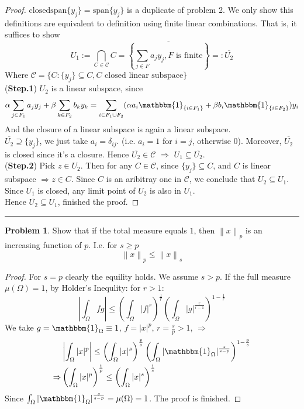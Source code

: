 \documentclass[a4paper, 10pt]{article}
\theoremstyle{definition}
\newtheorem{problem}{Problem}
\theoremstyle{hSol}
\begin{document}
\begin{proof} $\text{closedspan}\{y_j\}=\overline{\text{span}\{y_j\}}$ is a duplicate of problem 2. We only show this definitions are equivalent to definition using finite linear combinations. That is, it suffices to show
$$U_1:=\bigcap_{C\in \mathscr{C}}C = \overline{\left\{\sum_{j\in F} a_j y_j, \text{$F$ is finite}\right\}}=:\overline{U_2}$$
Where $\mathscr{C}=\{C: \{y_j\}\subseteq C, C \text{ closed linear subspace}\}$ \\
(\textbf{Step.1}) $U_2$ is a linear subspace, since
$$\alpha \sum_{j\in F_1} a_j y_j + \beta \sum_{k\in F_2} b_k y_k =  \sum_{i\in F_1 \cup F_2}(\alpha a_i \mathbbm{1}_{\{i\in F_1\}}+\beta b_i \mathbbm{1}_{\{i\in F_2\}}) y_i$$
And the closure of a linear subspace is again a linear subspace.\\
$\overline{U_2} \supseteq \{y_j\}$, we just take $a_i=\delta_{ij}$. (i.e. $a_i=1$ for $i=j$, otherwise $0$). Moreover, $\overline{U_2}$ is closed since it's a closure.
Hence $\overline{U_2} \in \mathscr{C}$ $\Rightarrow$ $U_1 \subseteq \overline{U_2}$. \\
(\textbf{Step.2}) Pick $z \in U_2$. Then for any $C\in \mathscr{C}$, since $\{y_j\}\subseteq C$, and $C$ is linear subspace $\Rightarrow z \in C$. Since $C$ is an aribitray one in $\mathscr{C}$, we conclude that $U_2 \subseteq U_1$. \\
Since $U_1$ is closed, any limit point of $U_2$ is also in $U_1$.\\
Hence $\overline{U_2} \subseteq U_1$, finished the proof.
\end{proof}

\noindent\rule{16cm}{0.4pt}
\begin{problem} Show that if the total measure equals $1$, then $\left\|x\right\|_p$ is an increasing function of $p$. I.e. for $s\geq p$
$$\left\|x\right\|_p \leq \left\|x\right\|_s$$
\end{problem}

\begin{proof} For $s=p$ clearly the equility holds. We assume $s>p$. If the full measure $\mu\left(\Omega\right)=1$, by Holder's Inequlity: for $r>1$:
\begin{equation}
	\left|\int_{\Omega} fg\right| \leq \left(\int_\Omega|f|^r \right)^{\frac{1}{r}}\left(\int_\Omega|g|^{\frac{r}{r-1}} \right)^{1-\frac{1}{r}}
\end{equation}
We take $g=\mathbbm{1}_{\Omega}\equiv 1$, $f=|x|^p$, $r=\frac{s}{p}>1$, $\Rightarrow$
\begin{equation}
	\begin{split}
		& \left|\int_{\Omega} |x|^p\right| \leq \left(\int_\Omega|x|^s \right)^{\frac{p}{s}}\left(\int_\Omega|\mathbbm{1}_{\Omega}|^{\frac{s}{s-p}} \right)^{1-\frac{p}{s}} \\
		\Rightarrow & \left(\int_{\Omega} |x|^p\right)^{\frac{1}{p}} \leq \left(\int_\Omega|x|^s \right)^{\frac{1}{s}}
	\end{split}
\end{equation}
Since $\int_\Omega|\mathbbm{1}_{\Omega}|^{\frac{s}{s-p}} = \mu(\Omega)=1$. The proof is finished.
\end{proof}
\end{document}
